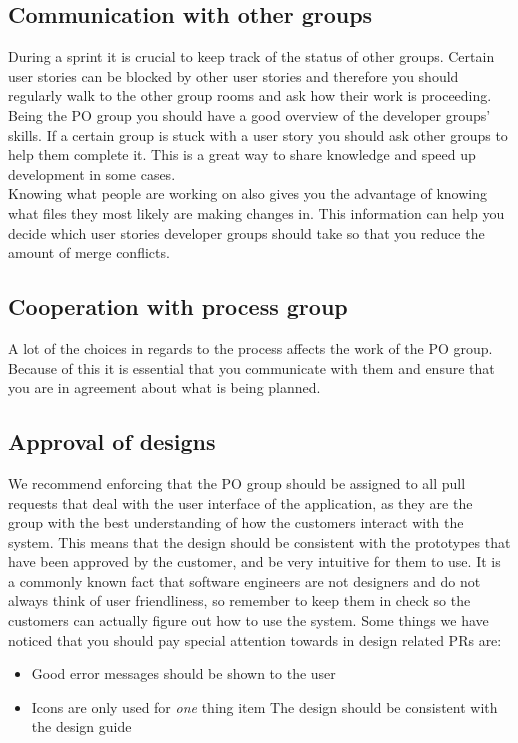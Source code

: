 \subsection{Communication with other groups}
During a sprint it is crucial to keep track of the status of other groups.
Certain user stories can be blocked by other user stories and therefore you should regularly walk to the other group rooms and ask how their work is proceeding.
\\
Being the PO group you should have a good overview of the developer groups' skills.
If a certain group is stuck with a user story you should ask other groups to help them complete it.
This is a great way to share knowledge and speed up development in some cases.
\\
Knowing what people are working on also gives you the advantage of knowing what files they most likely are making changes in.
This information can help you decide which user stories developer groups should take so that you reduce the amount of merge conflicts.


\subsection{Cooperation with process group}
A lot of the choices in regards to the process affects the work of the PO group.
Because of this it is essential that you communicate with them and ensure that you are in agreement about what is being planned.

\subsection{Approval of designs}
We recommend enforcing that the PO group should be assigned to all pull requests that deal with the user interface of the application, as they are the group with the best understanding of how the customers interact with the system.
This means that the design should be consistent with the prototypes that have been approved by the customer, and be very intuitive for them to use.
It is a commonly known fact that software engineers are not designers and do not always think of user friendliness, so remember to keep them in check so the customers can actually figure out how to use the system.
Some things we have noticed that you should pay special attention towards in design related PRs are: 
\begin{itemize}
    \item Good error messages should be shown to the user
    \item Icons are only used for \textit{one} thing
    item The design should be consistent with the design guide
\end{itemize}

